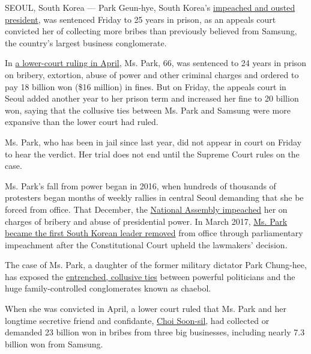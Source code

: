 SEOUL, South Korea --- Park Geun-hye, South Korea's
\href{https://www.nytimes3xbfgragh.onion/2017/03/09/world/asia/park-geun-hye-impeached-south-korea.html?action=click\&contentCollection=Asia\%20Pacific\&module=RelatedCoverage\&region=EndOfArticle\&pgtype=article}{impeached
and ousted president}, was sentenced Friday to 25 years in prison, as an
appeals court convicted her of collecting more bribes than previously
believed from Samsung, the country's largest business conglomerate.

In
\href{https://www.nytimes3xbfgragh.onion/2018/04/06/world/asia/park-geun-hye-south-korea.html}{a
lower-court ruling in April}, Ms. Park, 66, was sentenced to 24 years in
prison on bribery, extortion, abuse of power and other criminal charges
and ordered to pay 18 billion won (\$16 million) in fines. But on
Friday, the appeals court in Seoul added another year to her prison term
and increased her fine to 20 billion won, saying that the collusive ties
between Ms. Park and Samsung were more expansive than the lower court
had ruled.

Ms. Park, who has been in jail since last year, did not appear in court
on Friday to hear the verdict. Her trial does not end until the Supreme
Court rules on the case.

Ms. Park's fall from power began in 2016, when hundreds of thousands of
protesters began months of weekly rallies in central Seoul demanding
that she be forced from office. That December, the
\href{https://www.nytimes3xbfgragh.onion/2016/12/09/world/asia/south-korea-president-park-geun-hye-impeached.html}{National
Assembly impeached} her on charges of bribery and abuse of presidential
power. In March 2017,
\href{https://www.nytimes3xbfgragh.onion/2017/03/09/world/asia/park-geun-hye-impeached-south-korea.html?action=click\&contentCollection=Asia\%20Pacific\&module=RelatedCoverage\&region=EndOfArticle\&pgtype=article}{Ms.
Park became the first South Korean leader removed} from office through
parliamentary impeachment after the Constitutional Court upheld the
lawmakers' decision.

The case of Ms. Park, a daughter of the former military dictator Park
Chung-hee, has exposed the
\href{https://www.nytimes3xbfgragh.onion/2017/01/02/world/asia/south-korea-park-geun-hye-samsung.html}{entrenched,
collusive ties} between powerful politicians and the huge
family-controlled conglomerates known as chaebol.

When she was convicted in April, a lower court ruled that Ms. Park and
her longtime secretive friend and confidante,
\href{https://www.nytimes3xbfgragh.onion/2016/11/01/world/asia/south-korea-park-geun-hye-choi-soon-sil.html}{Choi
Soon-sil}, had collected or demanded 23 billion won in bribes from three
big businesses, including nearly 7.3 billion won from Samsung.

